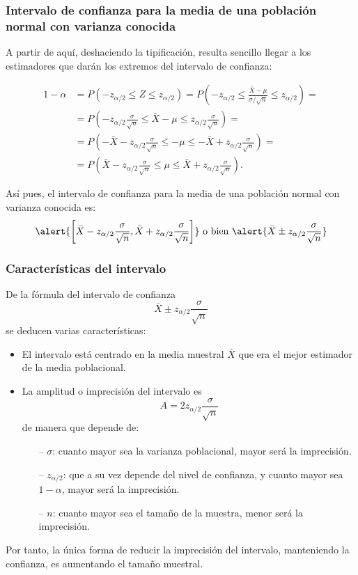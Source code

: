 \begin{frame}
\frametitle{Intervalo de confianza para la media de una población normal con varianza conocida}
A partir de aquí, deshaciendo la tipificación, resulta sencillo llegar a los estimadores que darán los extremos del intervalo de confianza:

\begin{align*}
1-\alpha &= P(-z_{\alpha/2}\leq Z \leq z_{\alpha/2}) = P\left(-z_{\alpha/2}\leq \frac{\bar X -\mu}{\sigma/\sqrt{n}} \leq z_{\alpha/2}\right) =\\
&= P\left(-z_{\alpha/2}\frac{\sigma}{\sqrt{n}}\leq \bar X -\mu \leq z_{\alpha/2}\frac{\sigma}{\sqrt{n}}\right)=\\
&= P\left(-\bar{X}-z_{\alpha/2}\frac{\sigma}{\sqrt{n}}\leq -\mu \leq -\bar{X}+z_{\alpha/2}\frac{\sigma}{\sqrt{n}}\right)= \\
&= P\left(\bar{X}-z_{\alpha/2}\frac{\sigma}{\sqrt{n}}\leq \mu \leq \bar{X}+z_{\alpha/2}\frac{\sigma}{\sqrt{n}}\right).
\end{align*}

Así pues, el intervalo de confianza para la media de una población normal con varianza conocida es:
\[
\alert{\left[\bar{X}-z_{\alpha/2}\frac{\sigma}{\sqrt{n}},\bar{X}+z_{\alpha/2}\frac{\sigma}{\sqrt{n}}\right]}
\mbox{ o bien }
\alert{\bar{X}\pm z_{\alpha/2}\frac{\sigma}{\sqrt{n}}}
\]
\end{frame}


\begin{frame}
\frametitle{Características del intervalo}
De la fórmula del intervalo de confianza
\[
\bar{X}\pm z_{\alpha/2}\frac{\sigma}{\sqrt{n}}
\]
se deducen varias características:
\begin{itemize}
\item El intervalo está centrado en la media muestral $\bar X$ que era el mejor estimador de la media poblacional.
\item La amplitud o imprecisión del intervalo es
\[
A= 2 z_{\alpha/2}\frac{\sigma}{\sqrt{n}}
\]
de manera que depende de:
\begin{itemize}
\item[--] $\sigma$: cuanto mayor sea la varianza poblacional, mayor será la imprecisión.
\item[--] $z_{\alpha/2}$: que a su vez depende del nivel de confianza, y cuanto mayor sea $1-\alpha$, mayor será la imprecisión.
\item[--] $n$: cuanto mayor sea el tamaño de la muestra, menor será la imprecisión.
\end{itemize}
\end{itemize}
Por tanto, la única forma de reducir la imprecisión del intervalo, manteniendo la confianza, es aumentando el tamaño muestral.
\end{frame}


